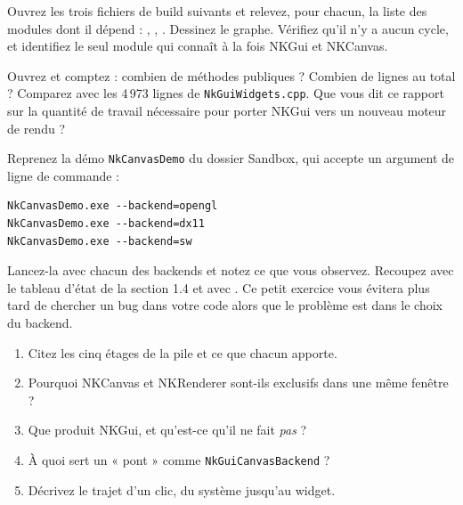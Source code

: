 \begin{nkdemo}
Ouvrez les trois fichiers de build suivants et relevez, pour chacun, la liste
des modules dont il dépend :
,
,
.
Dessinez le graphe. Vérifiez qu'il n'y a aucun cycle, et identifiez le seul
module qui connaît à la fois NKGui et NKCanvas.
\end{nkdemo}

\begin{nklogique}
Ouvrez
 et
comptez : combien de méthodes publiques ? Combien de lignes au total ? Comparez
avec les 4\,973 lignes de \texttt{NkGuiWidgets.cpp}. Que vous dit ce rapport sur
la quantité de travail nécessaire pour porter NKGui vers un nouveau moteur de
rendu ?
\end{nklogique}

\begin{nkpratique}
Reprenez la démo \texttt{NkCanvasDemo} du dossier Sandbox, qui accepte un
argument de ligne de commande :
\begin{verbatim}
NkCanvasDemo.exe --backend=opengl
NkCanvasDemo.exe --backend=dx11
NkCanvasDemo.exe --backend=sw
\end{verbatim}
Lancez-la avec chacun des backends et notez ce que vous observez. Recoupez avec
le tableau d'état de la section 1.4 et avec . Ce petit
exercice vous évitera plus tard de chercher un bug dans votre code alors que le
problème est dans le choix du backend.
\end{nkpratique}

\begin{nkquestions}
\begin{enumerate}
\item Citez les cinq étages de la pile et ce que chacun apporte.
\item Pourquoi NKCanvas et NKRenderer sont-ils exclusifs dans une même fenêtre ?
\item Que produit NKGui, et qu'est-ce qu'il ne fait \emph{pas} ?
\item À quoi sert un « pont » comme \texttt{NkGuiCanvasBackend} ?
\item Décrivez le trajet d'un clic, du système jusqu'au widget.
\end{enumerate}
\end{nkquestions}
